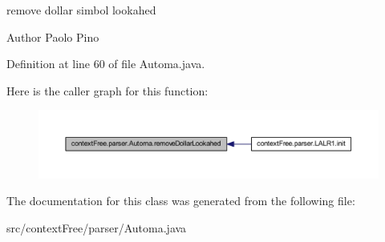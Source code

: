 remove dollar simbol lookahed 

\begin{DoxyAuthor}{Author}
Paolo Pino 
\end{DoxyAuthor}


Definition at line 60 of file Automa.\-java.



Here is the caller graph for this function\-:\nopagebreak
\begin{figure}[H]
\begin{center}
\leavevmode
\includegraphics[width=350pt]{classcontext_free_1_1parser_1_1_automa_ad94ecd3a9f8850220f86b6c54b751f78_icgraph}
\end{center}
\end{figure}




The documentation for this class was generated from the following file\-:\begin{DoxyCompactItemize}
\item 
src/context\-Free/parser/Automa.\-java\end{DoxyCompactItemize}
